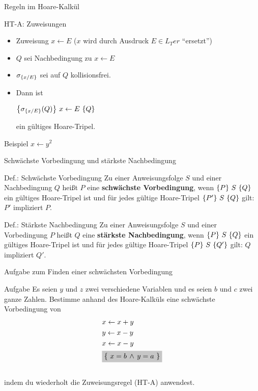 \begin{frame}{Regeln im Hoare-Kalkül}
	\begin{block}{HT-A: Zuweisungen}
		\begin{itemize}
			\item Zuweisung $x \leftarrow E$ ($x$ wird durch Ausdruck $E \in L_Ter$ ``ersetzt'')
			\item $Q$ sei Nachbedingung zu $x \leftarrow E$
			\item $\sigma_{\left\{ x/E \right\}}$ sei auf $Q$ kollisionsfrei.
			\item Dann ist \begin{center}
				$\left\{ \sigma_{\left\{ x/E \right\}}(Q) \right\} \, x\leftarrow E \, \left\{ Q \right\}$
			\end{center} ein gültiges Hoare-Tripel.
		\end{itemize}
	\end{block}
	\pause
	\begin{exampleblock}{Beispiel}
		\only<2>{\HTB{?}\\}
		\only<3>{\HTB{$y^{2}>0$}\\}
		$x \leftarrow y^{2}$\\
	\end{exampleblock}
	
\end{frame}

\begin{frame}{Schwächste Vorbedingung und stärkste Nachbedingung}
	\begin{block}{Def.: Schwächste Vorbedingung}
		Zu einer Anweisungsfolge $S$ und einer Nachbedingung $Q$ heißt $P$ eine \textbf{schwächste Vorbedingung}, wenn $\left\{ P \right\} \, S \, \left\{ Q \right\}$ ein gültiges Hoare-Tripel ist und für jedes gültige Hoare-Tripel $\left\{ P' \right\} \, S \, \left\{ Q \right\}$ gilt: $P'$ impliziert $P$.
	\end{block}

	\begin{block}{Def.: Stärkste Nachbedingung}
		Zu einer Anweisungsfolge $S$ und einer Vorbedingung $P$ heißt $Q$ eine \textbf{stärkste Nachbedingung}, wenn $\left\{ P \right\} \, S \, \left\{ Q \right\}$ ein gültiges Hoare-Tripel ist und für jedes gültige Hoare-Tripel $\left\{ P \right\} \, S \, \left\{ Q' \right\}$ gilt: $Q$ impliziert $Q'$.
	\end{block}
\end{frame}

\begin{frame}{Aufgabe zum Finden einer schwächsten Vorbedingung}
	\begin{exampleblock}{Aufgabe}
		Es seien $y$ und $z$ zwei verschiedene Variablen und es seien $b$ und $c$ zwei ganze
		Zahlen. Bestimme anhand des Hoare-Kalküls eine schwächste Vorbedingung von
		\begin{align*}
			& x \leftarrow x+y\\
			& y \leftarrow x-y\\
			& x \leftarrow x-y\\
			& \HTB{$x=b \, \wedge \, y=a$}
		\end{align*}
		\\[18pt]
		indem du wiederholt die Zuweisungsregel (HT-A) anwendest.
			
	\end{exampleblock}
\end{frame}

